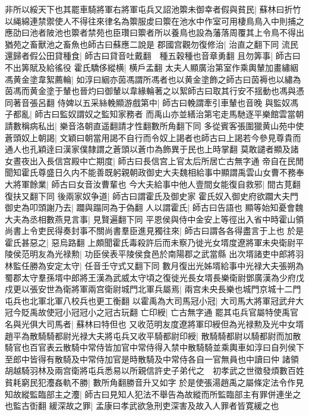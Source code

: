 非所以綏天下也其罷車騎將軍右將軍屯兵又詔池籞未御幸者假與貧民|{
	蘇林曰折竹以䋲綿連禁禦使人不得往來律名為籞服䖍曰籞在池水中作室可用棲鳥鳥入中則捕之應劭曰池者陂池也籞者禁苑也臣瓚曰籞者所以養鳥也設為藩落周覆其上令鳥不得出猶苑之畜獸池之畜魚也師古曰蘇應二說是}
郡國宫觀勿復修治|{
	治直之翻下同}
流民還歸者假公田貸種食|{
	師古曰貸音吐戴翻　種五穀種也音章勇翻}
且勿筭事|{
	師古曰不出筭賦及給徭役}
霍氏驕侈縱横|{
	横戶孟翻}
太夫人顯廣治第室作乘輿輦加畫繡絪馮黄金塗韋絮薦輪|{
	如淳曰絪亦茵馮謂所馮者也以黄金塗飾之師古曰茵褥也以繡為茵馮而黄金塗于輦也晉灼曰御輦以韋緣輪著之以絮師古曰取其行安不揺動也馮與憑同著音張呂翻}
侍婢以五采絲輓顯游戲第中|{
	師古曰輓謂牽引車輦也音晚}
與監奴馮子都亂|{
	師古曰監奴謂奴之監知家務者}
而禹山亦並繕治第宅走馬馳逐平樂館雲當朝請數稱病私出|{
	樂音洛朝直遥翻請才性翻數所角翻下同}
多從賓客張圍獵黄山苑中使蒼頭奴上朝謁|{
	文穎曰朝當用謁不自行而令奴上謁者也師古曰上謁若今參見尊貴而通人也孔穎逹曰漢家僕隸謂之蒼頭以蒼巾為飾異于民也上時掌翻}
莫敢譴者顯及諸女晝夜出入長信宫殿中亡期度|{
	師古曰長信宫上官太后所居亡古無字通}
帝自在民閒聞知霍氏尊盛日久内不能善既躬親朝政御史大夫魏相給事中顯謂禹雲山女曹不務奉大將軍餘業|{
	師古曰女音汝曹輩也}
今大夫給事中他人壹間女能復自救邪|{
	間古莧翻復扶又翻下同}
後兩家奴争道|{
	師古曰謂霍氏及御史家}
霍氏奴入御史府欲躢大夫門御史為叩頭謝乃去|{
	躢與蹋同為于偽翻}
人以謂霍氏|{
	師古曰告語也}
顯等始知憂會魏大夫為丞相數燕見言事|{
	見賢遍翻下同}
平恩侯與侍中金安上等徑出入省中時霍山領尚書上令吏民得奏封事不關尚書羣臣進見獨往來|{
	師古曰謂各各得盡言于上也}
於是霍氏甚惡之|{
	惡烏路翻}
上頗聞霍氏毒殺許后而未察乃徙光女壻度遼將軍未央衛尉平陵侯范明友為光禄勲|{
	功臣侯表平陵侯食邑於南陽郡之武當縣}
出次壻諸吏中郎將羽林監任勝為安定太守|{
	任音壬守式又翻下同}
數月復出光姊壻給事中光禄大夫張朔為蜀郡太守羣孫壻中郎將王漢為武威太守頃之復徙光長女壻長樂衛尉鄧廣漢為少府戊戍更以張安世為衛將軍兩宫衛尉城門北軍兵屬焉|{
	兩宫未央長樂也城門京城十二門屯兵也北軍北軍八校兵也更工衡翻}
以霍禹為大司馬冠小冠|{
	大司馬大將軍冠武弁大冠今貶禹故使冠小冠冠小之冠古玩翻}
亡印綬|{
	亡古無字通}
罷其屯兵官屬特使禹官名與光俱大司馬者|{
	蘇林曰特但也}
又收范明友度遼將軍印綬但為光禄勲及光中女壻趙平為散騎騎都尉光禄大夫將屯兵又收平騎都尉印綬|{
	散騎騎都尉以騎都尉而加散騎官也百官表云散騎中常侍皆加官中常侍得入禁中散騎騎並乘輿車如淳曰自列侯下至郎中皆得有散騎及中常侍加官是時散騎及中常侍各自一官無員也中讀曰仲}
諸領胡越騎羽林及兩宫衛將屯兵悉易以所親信許史子弟代之　初孝武之世徵發煩數百姓貧耗窮民犯灋姦軌不勝|{
	數所角翻勝音升又如字}
於是使張湯趙禹之屬條定法令作見知故縱監臨部主之灋|{
	師古曰見知人犯法不舉告為故縱而所監臨部主有罪併連坐之也監古衘翻}
緩深故之罪|{
	孟康曰孝武欲急刑吏深害及故入人罪者皆寛緩之也}
